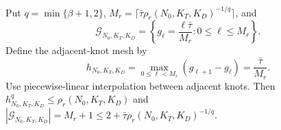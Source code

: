 Put \(q=\min\{\beta+1,2\}\), \(M_r=\lceil\bar\tau\rho_r(N_0,K_T,K_D)^{-1/q}\rceil\), and
\[
 \mathcal G_{N_0,K_T,K_D}
 =\left\{g_\ell=\frac{\ell\bar\tau}{M_r}:0\le\ell\le M_r\right\}.
\]
Define the adjacent-knot mesh by
\[
 h_{N_0,K_T,K_D}=\max_{0\le\ell<M_r}(g_{\ell+1}-g_\ell)
 =\frac{\bar\tau}{M_r}.
\]
Use piecewise-linear interpolation between adjacent knots. Then \(h_{N_0,K_T,K_D}^q\le\rho_r(N_0,K_T,K_D)\) and \(|\mathcal G_{N_0,K_T,K_D}|=M_r+1\le2+\bar\tau\rho_r(N_0,K_T,K_D)^{-1/q}\).
